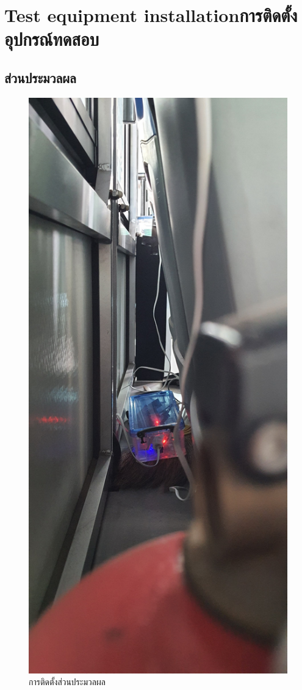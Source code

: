 \chapter{\ifenglish Test equipment installation\else การติดตั้งอุปกรณ์ทดสอบ\fi}
\section{ส่วนประมวลผล}
    \begin{figure}[h!]
        \begin{center}
        \includegraphics[width=\textwidth,angle=-90,origin=c]{install_mid.jpg}
        \end{center}
        \caption{การติดตั้งส่วนประมวลผล}
        \label{fig:install_mid}
    \end{figure}
